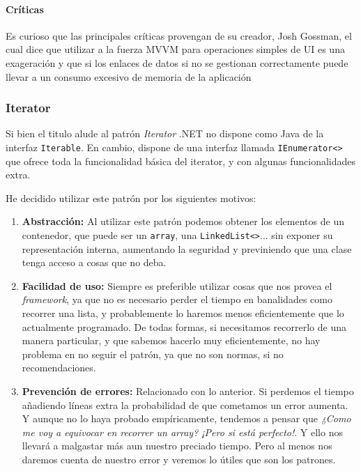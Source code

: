 \paragraph{Cr\'{i}ticas}
Es curioso que las principales cr\'{i}ticas provengan de su creador, Josh Gossman, el cual dice que utilizar a la fuerza MVVM para operaciones simples
de UI es una exageraci\'{o}n y que si los enlaces de datos si no se gestionan correctamente puede llevar a un consumo excesivo de 
memoria de la aplicaci\'{o}n \cite{MVVM:Criticism}

\subsubsection{Iterator}
Si bien el titulo alude al patr\'{o}n \emph{Iterator} .NET no dispone como Java de la interfaz \texttt{Iterable}.
En cambio, dispone de una interfaz llamada \texttt{IEnumerator<>} que ofrece toda la funcionalidad b\'{a}sica del iterator,
y con algunas funcionalidades extra.

He decidido utilizar este patr\'{o}n por los siguientes motivos:
\begin{enumerate}
    \item \textbf{Abstracci\'{o}n:}
    Al utilizar este patr\'{o}n podemos obtener los elementos de un contenedor, que puede ser un \texttt{array}, una \texttt{LinkedList<>}... sin
    exponer su representaci\'{o}n interna, aumentando la seguridad y previniendo que una clase tenga acceso a cosas que no deba.
    
    \item \textbf{Facilidad de uso:}
    Siempre es preferible utilizar cosas que nos provea el \emph{framework}, ya que no es necesario perder el tiempo en banalidades como 
    recorrer una lista, y probablemente lo haremos menos eficientemente que lo actualmente programado. De todas formas, si necesitamos
    recorrerlo de una manera particular, y que sabemos hacerlo muy eficientemente, no hay problema en no seguir el patr\'{o}n, ya que no son
    normas, si no recomendaciones.
    
    \item \textbf{Prevenci\'{o}n de errores:}
    Relacionado con lo anterior. Si perdemos el tiempo a\~{n}adiendo l\'{i}neas extra la probabilidad de que cometamos un error aumenta. Y aunque
    no lo haya probado emp\'{i}ricamente, tendemos a pensar que \emph{¿Como me voy a equivocar en recorrer un array? ¡Pero si est\'{a} perfecto!}. 
    Y ello nos llevar\'{a} a malgastar m\'{a}s aun nuestro preciado tiempo. Pero al menos nos daremos cuenta de nuestro error y veremos lo
    \'{u}tiles que son los patrones.
\end{enumerate}

